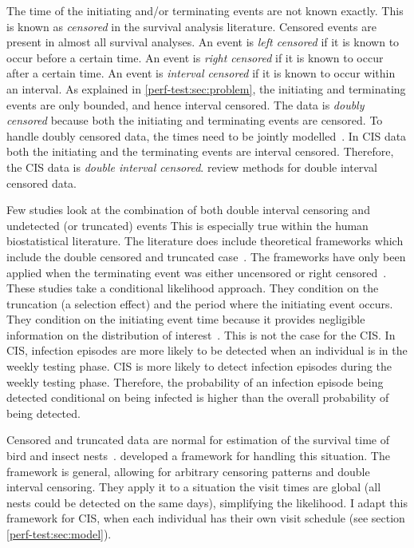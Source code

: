\documentclass[thesis.tex]{subfiles}
\begin{document}
The time of the initiating and/or terminating events are not known exactly.
This is known as \emph{censored} in the survival analysis literature.
Censored events are present in almost all survival analyses.
An event is \emph{left censored} if it is known to occur before a certain time.
An event is \emph{right censored} if it is known to occur after a certain time.
An event is \emph{interval censored} if it is known to occur within an interval.
As explained in \cref{perf-test:sec:problem}, the initiating and terminating events are only bounded, and hence interval censored.
The data is \emph{doubly censored} because both the initiating and terminating events are censored.
To handle doubly censored data, the times need to be jointly modelled~\autocite[and references therein]{liSemiparametric}.
In CIS data both the initiating and the terminating events are interval censored.
Therefore, the CIS data is \emph{double interval censored}.
\Textcite{sunAnalysis,bogaertsSurvival} review methods for double interval censored data.

Few studies look at the combination of both double interval censoring and undetected (or truncated) events
This is especially true within the human biostatistical literature.
The literature does include theoretical frameworks which include the double censored and truncated case~\autocites{turnbullEmpirical}{dempsterMaximum}.
The frameworks have only been applied when the terminating event was either uncensored or right censored~\autocite{sunEmpirical,bacchettiNonparametric}.
These studies \autocite[and elsewhere, e.g.:][]{shenNonparametric} take a conditional likelihood approach.
They condition on the truncation (a selection effect) and the period where the initiating event occurs.
They condition on the initiating event time because it provides negligible information on the distribution of interest~.
This is not the case for the CIS.
In CIS, infection episodes are more likely to be detected when an individual is in the weekly testing phase.
CIS is more likely to detect infection episodes during the weekly testing phase.
Therefore, the probability of an infection episode being detected conditional on being infected is higher than the overall probability of being detected.

Censored and truncated data are normal for estimation of the survival time of bird and insect nests~\autocite{heiseyABCs}.
\textcite{heiseyModelling} developed a framework for handling this situation.
The framework is general, allowing for arbitrary censoring patterns and double interval censoring.
They apply it to a situation the visit times are global (all nests could be detected on the same days), simplifying the likelihood.
I adapt this framework for CIS, when each individual has their own visit schedule (see section \cref{perf-test:sec:model}).
\end{document}

